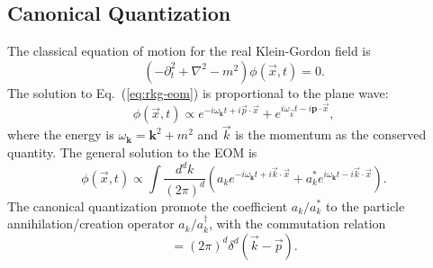 \subsection{Canonical Quantization}
The classical equation of motion for the real Klein-Gordon field is 
\begin{equation}
	(-\partial_t^2+\nabla^2-m^2)\phi(\vec x,t) = 0. 
	\label{eq:rkg-eom}
\end{equation}
The solution to Eq.~(\ref{eq:rkg-eom}) is proportional to the plane wave:
\begin{equation}
	\phi(\vec x, t) \propto e^{-i\omega_{\bm{k}}t+i\vec{p}\cdot\vec{x}} + e^{i\omega_{\vec{k}}t-i\bm{p}\cdot\vec{x}},
\end{equation}
where the energy is $\omega_{\bm{k}}=\bm{k}^2+m^2$ and $\vec k$ is the momentum as the conserved quantity.
The general solution to the EOM is
\begin{equation}
	\phi(\vec x,t) \propto \int \frac{d^d k}{(2\pi)^d} \left(
		a_{k}e^{-i\omega_{\bm{k}}t+i\vec{k}\cdot\vec{x}} + 
		a^*_{k}e^{i\omega_{\bm{k}}t-i\vec{k}\cdot\vec{x}} 
	\right).
\end{equation}
The canonical quantization promote the coefficient $a_{k}/a_{k}^*$ to the particle annihilation/creation operator $a_{k}/a_{k}^\dagger$, with the commutation relation
\begin{equation}
	[a_{k}, a_{p}^\dagger] = (2\pi)^d \delta^d(\vec{k}-\vec{p}).
\end{equation}

